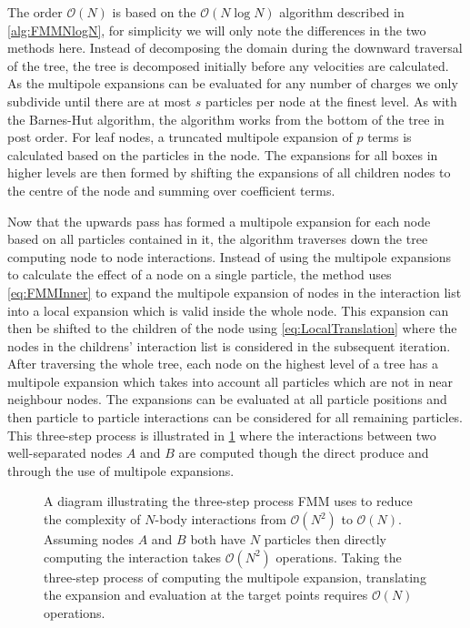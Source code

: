 The order $\mathcal{O}(N)$ is based on the $\mathcal{O}(N\log N)$ algorithm described in \cref{alg:FMMNlogN}, for simplicity we will only note the differences in the two methods here. Instead of decomposing the domain during the downward traversal of the tree, the tree is decomposed initially before any velocities are calculated. As the multipole expansions can be evaluated for any number of charges we only subdivide until there are at most $s$ particles per node at the finest level. As with the Barnes-Hut algorithm, the algorithm works from the bottom of the tree in post order. For leaf nodes, a truncated multipole expansion of $p$ terms is calculated based on the particles in the node. The expansions for all boxes in higher levels are then formed by shifting the expansions of all children nodes to the centre of the node and summing over coefficient terms.

Now that the upwards pass has formed a multipole expansion for each node based on all particles contained in it, the algorithm traverses down the tree computing node to node interactions. Instead of using the multipole expansions to calculate the effect of a node on a single particle, the method uses \cref{eq:FMMInner} to expand the multipole expansion of nodes in the interaction list into a local expansion which is valid inside the whole node. This expansion can then be shifted to the children of the node using \cref{eq:LocalTranslation} where the nodes in the childrens' interaction list is considered in the subsequent iteration.  After traversing the whole tree, each node on the highest level of a tree has a multipole expansion which takes into account all particles which are not in near neighbour nodes. The expansions can  be evaluated at all particle positions and then particle to particle interactions can be considered for all remaining particles. This three-step process is illustrated in \cref{fig:3Step} where the interactions between two well-separated nodes $A$ and $B$ are computed though the direct produce and through the use of multipole expansions.

\begin{figure}
    \centering
        \resizebox{.6\linewidth}{!}{}
    \caption[A diagram illustrating the three-step process FMM uses to reduce the complexity of $N$-body interactions from $\mathcal{O}(N^2)$ to $\mathcal{O}(N)$.]{A diagram illustrating the three-step process FMM uses to reduce the complexity of $N$-body interactions from $\mathcal{O}(N^2)$ to $\mathcal{O}(N)$. Assuming nodes $A$ and $B$ both have $N$ particles then directly computing the interaction takes $\mathcal{O}(N^2)$ operations. Taking the three-step process of computing the multipole expansion, translating the expansion and evaluation at the target points requires $\mathcal{O}(N)$ operations.
    }
    \label{fig:3Step}
\end{figure}

